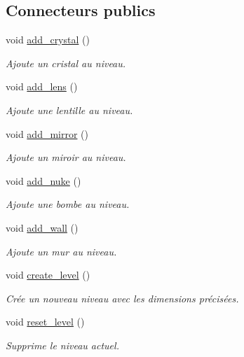 \subsection*{Connecteurs publics}
\begin{DoxyCompactItemize}
\item 
void \hyperlink{classElements_a964576c05a5b9ec733a663474f8fd978}{add\+\_\+crystal} ()
\begin{DoxyCompactList}\small\item\em Ajoute un cristal au niveau. \end{DoxyCompactList}\item 
void \hyperlink{classElements_a8093eca3330566813da371aecc96530c}{add\+\_\+lens} ()
\begin{DoxyCompactList}\small\item\em Ajoute une lentille au niveau. \end{DoxyCompactList}\item 
void \hyperlink{classElements_a8d7a4e7ff0c84f105f0f0116425293a7}{add\+\_\+mirror} ()
\begin{DoxyCompactList}\small\item\em Ajoute un miroir au niveau. \end{DoxyCompactList}\item 
void \hyperlink{classElements_aa0884faf781bb26d6ca4dd8751b0eb32}{add\+\_\+nuke} ()
\begin{DoxyCompactList}\small\item\em Ajoute une bombe au niveau. \end{DoxyCompactList}\item 
void \hyperlink{classElements_ad4b05e8a07d9f6867035243c5e3f7572}{add\+\_\+wall} ()
\begin{DoxyCompactList}\small\item\em Ajoute un mur au niveau. \end{DoxyCompactList}\item 
\hypertarget{classElements_ad4bfaa4ea43fffd8653224165b5bbc29}{void \hyperlink{classElements_ad4bfaa4ea43fffd8653224165b5bbc29}{create\+\_\+level} ()}\label{classElements_ad4bfaa4ea43fffd8653224165b5bbc29}

\begin{DoxyCompactList}\small\item\em Crée un nouveau niveau avec les dimensions précisées. \end{DoxyCompactList}\item 
\hypertarget{classElements_a938cdaf6c97d1c9e5db80280b6379176}{void \hyperlink{classElements_a938cdaf6c97d1c9e5db80280b6379176}{reset\+\_\+level} ()}\label{classElements_a938cdaf6c97d1c9e5db80280b6379176}

\begin{DoxyCompactList}\small\item\em Supprime le niveau actuel. \end{DoxyCompactList}\end{DoxyCompactItemize}
